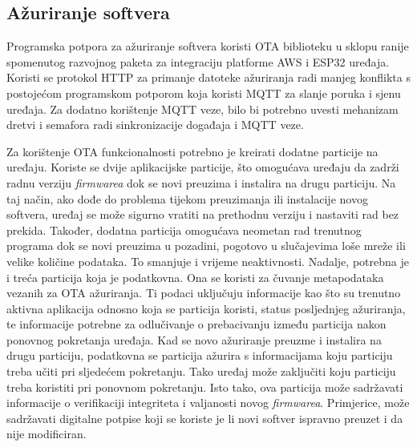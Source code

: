 \subsection{Ažuriranje softvera}

Programska potpora za ažuriranje softvera koristi OTA biblioteku u sklopu ranije spomenutog razvojnog paketa za integraciju platforme AWS i ESP32 uređaja. Koristi se protokol HTTP za primanje datoteke ažuriranja radi manjeg konflikta s postojećom programskom potporom koja koristi MQTT za slanje poruka i sjenu uređaja. Za dodatno korištenje MQTT veze, bilo bi potrebno uvesti mehanizam dretvi i semafora radi sinkronizacije događaja i MQTT veze. 

Za korištenje OTA funkcionalnosti potrebno je kreirati dodatne particije na uređaju. Koriste se dvije aplikacijske particije, što omogućava uređaju da zadrži radnu verziju \textit{firmwarea} dok se novi preuzima i instalira na drugu particiju. Na taj način, ako dođe do problema tijekom preuzimanja ili instalacije novog softvera, uređaj se može sigurno vratiti na prethodnu verziju  i nastaviti rad bez prekida. Također, dodatna particija omogućava neometan rad trenutnog programa dok se novi preuzima u pozadini, pogotovo u slučajevima loše mreže ili velike količine podataka. To smanjuje i vrijeme neaktivnosti. Nadalje, potrebna je i treća particija koja je podatkovna. Ona se koristi za čuvanje metapodataka vezanih za OTA ažuriranja. Ti podaci uključuju informacije kao što su trenutno aktivna aplikacija odnosno koja se particija koristi, status posljednjeg ažuriranja, te informacije potrebne za odlučivanje o prebacivanju između particija nakon ponovnog pokretanja uređaja. Kad se novo ažuriranje preuzme i instalira na drugu particiju, podatkovna se particija ažurira s informacijama koju particiju treba učiti pri sljedećem pokretanju. Tako uređaj može zaključiti koju particiju treba koristiti pri ponovnom pokretanju. Isto tako, ova particija može sadržavati informacije o verifikaciji integriteta i valjanosti novog \textit{firmwarea}. Primjerice, može sadržavati digitalne potpise koji se koriste je li novi softver ispravno preuzet i da nije modificiran. 

